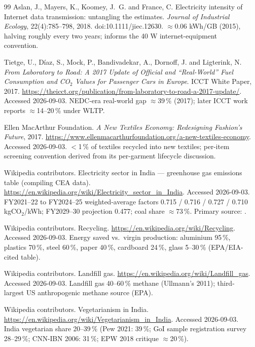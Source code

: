 \documentclass[11pt,a4paper]{article}
\begin{document}
\begin{thebibliography}{99}
Aslan, J., Mayers, K., Koomey, J.~G. and France, C. Electricity intensity of Internet data transmission: untangling the estimates.
\textit{Journal of Industrial Ecology}, 22(4):785--798, 2018. doi:10.1111/jiec.12630.
$\approx$0.06 kWh/GB (2015), halving roughly every two years; informs the 40 W internet-equipment convention.

Tietge, U., D\'iaz, S., Mock, P., Bandivadekar, A., Dornoff, J. and Ligterink, N.
\textit{From Laboratory to Road: A 2017 Update of Official and ``Real-World'' Fuel Consumption and CO$_2$ Values for Passenger Cars in Europe}. ICCT White Paper, 2017.
\url{https://theicct.org/publication/from-laboratory-to-road-a-2017-update/}. Accessed 2026-09-03.
NEDC-era real-world gap $\approx$39\,\% (2017); later ICCT work reports $\approx$14--20\,\% under WLTP.

Ellen MacArthur Foundation. \textit{A New Textiles Economy: Redesigning Fashion's Future}, 2017.
\url{https://www.ellenmacarthurfoundation.org/a-new-textiles-economy}. Accessed 2026-09-03.
$<$1\,\% of textiles recycled into new textiles; per-item screening convention derived from its per-garment lifecycle discussion.

Wikipedia contributors. Electricity sector in India --- greenhouse gas emissions table (compiling CEA data).
\url{https://en.wikipedia.org/wiki/Electricity_sector_in_India}. Accessed 2026-09-03.
FY2021--22 to FY2024--25 weighted-average factors 0.715 / 0.716 / 0.727 / 0.710 kgCO$_2$/kWh; FY2029--30 projection 0.477; coal share $\approx$73\,\%. Primary source: \cite{cea_baseline}.

Wikipedia contributors. Recycling. \url{https://en.wikipedia.org/wiki/Recycling}. Accessed 2026-09-03.
Energy saved vs.\ virgin production: aluminium 95\,\%, plastics 70\,\%, steel 60\,\%, paper 40\,\%, cardboard 24\,\%, glass 5--30\,\% (EPA/EIA-cited table).

Wikipedia contributors. Landfill gas. \url{https://en.wikipedia.org/wiki/Landfill_gas}. Accessed 2026-09-03.
Landfill gas 40--60\,\% methane (Ullmann's 2011); third-largest US anthropogenic methane source (EPA).

Wikipedia contributors. Vegetarianism in India. \url{https://en.wikipedia.org/wiki/Vegetarianism_in_India}. Accessed 2026-09-03.
India vegetarian share 20--39\,\% (Pew 2021: 39\,\%; GoI sample registration survey 28--29\,\%; CNN-IBN 2006: 31\,\%; EPW 2018 critique $\approx$20\,\%).

\end{thebibliography}
\end{document}
